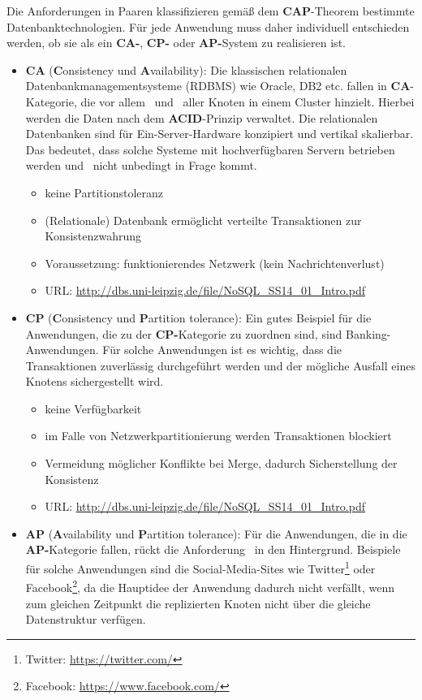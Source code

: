 Die Anforderungen in Paaren klassifizieren gemäß dem \textbf{CAP}-Theorem bestimmte Datenbanktechnologien. Für jede Anwendung muss daher individuell entschieden werden, ob sie als ein \textbf{CA-}, \textbf{CP-} oder \textbf{AP-}System zu realisieren ist.
\begin{itemize}
\item \textbf{CA} (\textbf{C}onsistency und \textbf{A}vailability): Die klassischen relationalen Datenbankmanagementsysteme (RDBMS) wie Oracle, DB2 etc. fallen in \textbf{CA}-Kategorie, die vor allem \Cap\ und \cAp\ aller Knoten in einem Cluster hinzielt. Hierbei werden die Daten nach dem \textbf{ACID}-Prinzip verwaltet. Die relationalen Datenbanken sind für Ein-Server-Hardware konzipiert und vertikal skalierbar. Das bedeutet, dass solche Systeme mit hochverfügbaren Servern betrieben werden und \caP\  nicht unbedingt in Frage kommt.

\begin{itemize}
\item keine Partitionstoleranz
\item (Relationale) Datenbank ermöglicht verteilte Transaktionen zur Konsistenzwahrung
\item Voraussetzung: funktionierendes Netzwerk (kein Nachrichtenverlust)
\item URL: \url{http://dbs.uni-leipzig.de/file/NoSQL_SS14_01_Intro.pdf}
\end{itemize}

\item \textbf{CP} (\textbf{C}onsistency und \textbf{P}artition tolerance): Ein gutes Beispiel für die Anwendungen, die zu der \textbf{CP-}Kategorie zu zuordnen sind, sind Banking-Anwendungen. Für solche Anwendungen ist es wichtig, dass die Transaktionen zuverlässig durchgeführt werden und der mögliche Ausfall eines Knotens sichergestellt wird.

\begin{itemize}
\item keine Verfügbarkeit
\item im Falle von Netzwerkpartitionierung werden Transaktionen blockiert
\item Vermeidung möglicher Konflikte bei Merge, dadurch Sicherstellung der Konsistenz
\item URL: \url{http://dbs.uni-leipzig.de/file/NoSQL_SS14_01_Intro.pdf}
\end{itemize}

\item \textbf{AP} (\textbf{A}vailability und \textbf{P}artition tolerance): Für die Anwendungen, die in die \textbf{AP-}Kategorie fallen, rückt die Anforderung \Cap\ in den Hintergrund. Beispiele für solche Anwendungen sind die Social-Media-Sites wie Twitter\footnote{Twitter: \url{https://twitter.com/}} oder Facebook\footnote{Facebook: \url{https://www.facebook.com/}}, da die Hauptidee der Anwendung dadurch nicht verfällt, wenn zum gleichen Zeitpunkt die replizierten Knoten nicht über die gleiche Datenstruktur verfügen. 
\end{itemize}


